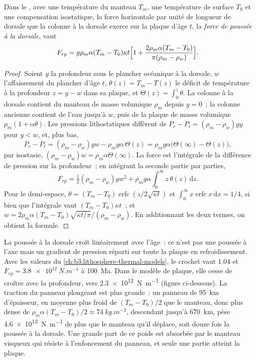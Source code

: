 \begin{proposition}\label{prop:b3:mantle-convection:ridge-push}
Dans le , avec une température du manteau $T_m$, une température de surface
$T_0$ et une compensation isostatique, la force horizontale par unité
de longueur de dorsale que la colonne à la dorsale exerce sur la plaque d'âge $t$,
la \emph{force de poussée à la dorsale}, vaut
\[
  F_{rp} = g\rho_m\alpha(T_m - T_0)\kappa t\Bigl[1 + \frac{2\rho_m\alpha(T_m
  - T_0)}{\pi(\rho_m - \rho_w)}\Bigr].
\]
\end{proposition}

\begin{proof}
Soient $y$ la profondeur sous le plancher océanique à la dorsale, $w$ l'affaissement du
plancher d'âge $t$, $\theta(z) = T_m - T(z)$ le déficit de température à la
profondeur $z = y - w$ dans sa plaque, et $\Theta(z) = \int_0^z\theta$. La
colonne à la dorsale contient du manteau de masse volumique $\rho_m$ depuis $y = 0$~; la
colonne ancienne contient de l'eau jusqu'à $w$, puis de la plaque de masse volumique $\rho_m(1 + \alpha\theta)$. Les
pressions lithostatiques diffèrent de $P_r - P_t = (\rho_m - \rho_w)gy$ pour $y < w$,
et, plus bas,
\[
  P_r - P_t = (\rho_m - \rho_w)gw - \rho_mg\alpha\,\Theta(z)
  = \rho_mg\alpha\bigl(\Theta(\infty) - \Theta(z)\bigr),
\]
par isostasie, $(\rho_m - \rho_w)w = \rho_m\alpha\Theta(\infty)$. La force est
l'intégrale de la différence de pression sur la profondeur~; en intégrant la seconde partie par
parties,
\[
  F_{rp} = \tfrac12(\rho_m - \rho_w)gw^2 + \rho_mg\alpha\int_0^\infty
  z\,\theta(z)\,\mathrm dz .
\]
Pour le demi-espace, $\theta = (T_m - T_0)\operatorname{erfc}(z/2\sqrt{\kappa
t})$ et $\int_0^\infty x\operatorname{erfc}x\,\mathrm dx = 1/4$, si bien que
l'intégrale vaut $(T_m - T_0)\kappa t$~; et $w = 2\rho_m\alpha(T_m -
T_0)\sqrt{\kappa t/\pi}/(\rho_m - \rho_w)$. En additionnant les deux termes, on obtient la
formule.
\end{proof}

La poussée à la dorsale croît linéairement avec l'âge~: ce n'est pas une poussée à l'axe mais un
gradient de pression réparti sur toute la plaque en refroidissement. Avec les valeurs
du \cref{ch:b3:lithosphere-thermal-models}, le crochet vaut 1.04 et $F_{rp} =
\qty{3.8e12}{N.m^{-1}}$ à \qty{100}{Ma}. Dans le modèle de plaque, elle cesse de croître
avec la profondeur, vers \qty{2.3e12}{N.m^{-1}} (figure ci-dessous). La traction du panneau plongeant est
plus grande~: un panneau de \qty{95}{km} d'épaisseur, en moyenne plus froid de $(T_m - T_0)/2$ que le
manteau, donc plus dense de $\rho_m\alpha(T_m - T_0)/2 \approx
\qty{74}{kg.m^{-3}}$, descendant jusqu'à \qty{670}{km}, pèse
\qty{4.6e13}{N.m^{-1}} de plus que le manteau qu'il déplace, soit douze fois la
poussée à la dorsale. Une grande part de ce poids est absorbée par le manteau visqueux qui résiste à
l'enfoncement du panneau, et seule une partie atteint la plaque.


